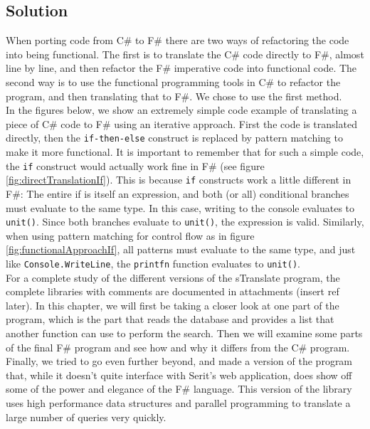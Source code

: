\documentclass[12pt, a4paper]{article}
\newcommand{\code}[1]{{\small \texttt{#1}}}
\begin{document}
\newpage

\subsection{Solution}
When porting code from C\# to F\# there are two ways of refactoring the code into being functional. The first is to translate the C\# code directly to F\#, almost line by line, and then refactor the F\# imperative code into functional code. The second way is to use the functional programming tools in C\# to refactor the program, and then translating that to F\#. We chose to use the first method.\\

In the figures below, we show an extremely simple code example of translating a piece of C\# code to F\# using an iterative approach. First the code is translated directly, then the \code{if-then-else} construct is replaced by pattern matching to make it more functional. It is important to remember that for such a simple code, the \code{if} construct would actually work fine in F\# (see figure \ref{fig:directTranslationIf}). This is because \code{if} constructs work a little different in F\#: The entire if is itself an expression, and both (or all) conditional branches must evaluate to the same type. In this case, writing to the console evaluates to \code{unit()}. Since both branches evaluate to \code{unit()}, the expression is valid. Similarly, when using pattern matching for control flow as in figure \ref{fig:functionalApproachIf}, all patterns must evaluate to the same type, and just like \code{Console.WriteLine}, the \code{printfn} function evaluates to \code{unit()}.\\

For a complete study of the different versions of the sTranslate program, the complete libraries with comments are documented in attachments (insert ref later). In this chapter, we will first be taking a closer look at one part of the program, which is the part that reads the database and provides a list that another function can use to perform the search. Then we will examine some parts of the final F\# program and see how and why it differs from the C\# program. Finally, we tried to go even further beyond, and made a version of the program that, while it doesn't quite interface with Serit's web application, does show off some of the power and elegance of the F\# language. This version of the library uses high performance data structures and parallel programming to translate a large number of queries very quickly.
\end{document}
